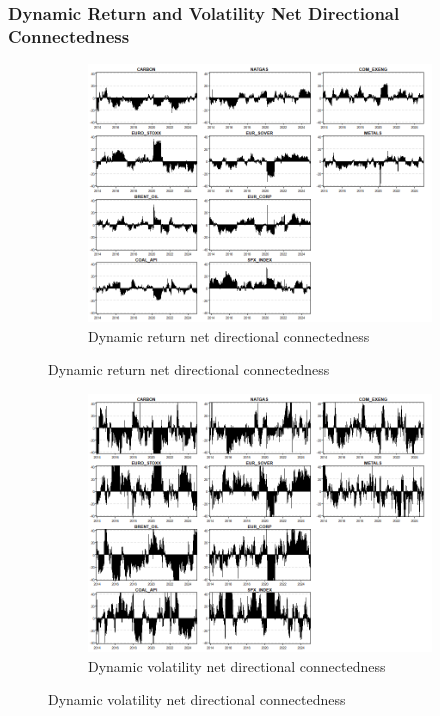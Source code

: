 \documentclass[preprint, 3p,
authoryear]{elsarticle} %
\begin{document}
\begin{landscape}
\subsubsection{Dynamic Return and Volatility Net Directional Connectedness}

\begin{figure}[H]
  \caption{Dynamic Net Directional Connectedness (Jan 2013 – Jan 2025)}
    \centering
      \begin{subfigure}[a]{\textwidth}
        \caption{Dynamic return net directional connectedness}
        \includegraphics[width = 1.25\linewidth]{20aApdxD-8-220-RetNDC}
      \end{subfigure}
\end{figure}
\begin{figure}[H]
  \ContinuedFloat
  \centering
      \begin{subfigure}[b]{\textwidth}
        \caption{Dynamic volatility net directional connectedness}
        \includegraphics[width = 1.25\linewidth]{20bApdxD-8-220-VolNDC}
      \end{subfigure}
\end{figure}




\end{landscape}
\end{document}
